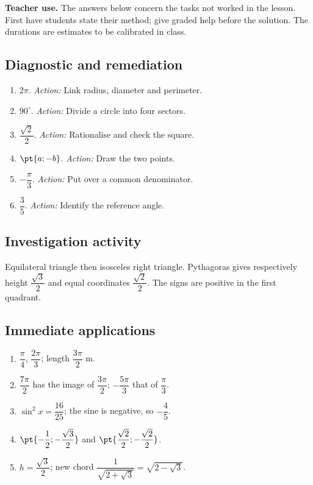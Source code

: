 \label{C10-CORR}
\textbf{Teacher use.} The answers below concern the tasks not worked in the lesson. First have students state their method; give graded help before the solution. The durations are estimates to be calibrated in class.
\subsection*{Diagnostic and remediation}
\begin{enumerate}
\item $2\pi$. \textit{Action:} Link radius, diameter and perimeter.
\item $90^\circ$. \textit{Action:} Divide a circle into four sectors.
\item $\dfrac{\sqrt 2}{2}$. \textit{Action:} Rationalise and check the square.
\item $\pt{a;-b}$. \textit{Action:} Draw the two points.
\item $-\dfrac{\pi}{3}$. \textit{Action:} Put over a common denominator.
\item $\dfrac{3}{5}$. \textit{Action:} Identify the reference angle.
\end{enumerate}
\subsection*{Investigation activity}
Equilateral triangle then isosceles right triangle. Pythagoras gives respectively height $\dfrac{\sqrt 3}{2}$ and equal coordinates $\dfrac{\sqrt 2}{2}$. The signs are positive in the first quadrant.
\subsection*{Immediate applications}
\begin{enumerate}
\item $\dfrac{\pi}{4}$, $\dfrac{2\pi}{3}$; length $\dfrac{3\pi}{2}$ m.
\item $\dfrac{7\pi}{2}$ has the image of $\dfrac{3\pi}{2}$; $-\dfrac{5\pi}{3}$ that of $\dfrac{\pi}{3}$.
\item $\sin ^2x=\dfrac{16}{25}$; the sine is negative, so $-\dfrac{4}{5}$.
\item $\pt{-\dfrac{1}{2};-\dfrac{\sqrt 3}{2}}$ and $\pt{\dfrac{\sqrt 2}{2};-\dfrac{\sqrt 2}{2}}$.
\item $h=\dfrac{\sqrt 3}{2}$; new chord $\dfrac{1}{\sqrt {2+\sqrt3}}=\sqrt {2-\sqrt3}$.
\end{enumerate}

